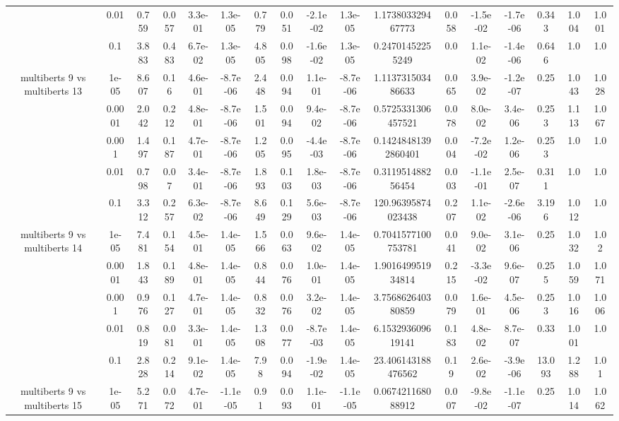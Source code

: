 \begin{tabular}{|c|c|c|c|c|c|c|c|c|c|c|c|c|c|c|c|c|}
 & 0.01 & 0.759 & 0.057 & 3.3e-01 & 1.3e-05 & 0.779 & 0.051 & -2.1e-02 & 1.3e-05 & 1.173803329467773 & 0.058 & -1.5e-02 & -1.7e-06 & 0.343 & 1.004 & 1.001 \\
 & 0.1 & 3.883 & 0.483 & 6.7e-02 & 1.3e-05 & 4.805 & 0.098 & -1.6e-02 & 1.3e-05 & 0.24701452255249 & 0.0 & 1.1e-02 & -1.4e-06 & 0.646 & 1.0 & 1.0 \\
\hline
\multirow{5}{*}{multiberts 9 vs multiberts 13} & 1e-05 & 8.607 & 0.16 & 4.6e-01 & -8.7e-06 & 2.448 & 0.094 & 1.1e-01 & -8.7e-06 & 1.113731503486633 & 0.065 & 3.9e-02 & -1.2e-07 & 0.25 & 1.043 & 1.028 \\
 & 0.0001 & 2.042 & 0.212 & 4.8e-01 & -8.7e-06 & 1.501 & 0.094 & 9.4e-02 & -8.7e-06 & 0.5725331306457521 & 0.078 & 8.0e-02 & 3.4e-06 & 0.253 & 1.113 & 1.067 \\
 & 0.001 & 1.497 & 0.187 & 4.7e-01 & -8.7e-06 & 1.205 & 0.095 & -4.4e-03 & -8.7e-06 & 0.14248481392860401 & 0.004 & -7.2e-02 & 1.2e-06 & 0.253 & 1.0 & 1.0 \\
 & 0.01 & 0.798 & 0.07 & 3.4e-01 & -8.7e-06 & 1.893 & 0.103 & 1.8e-03 & -8.7e-06 & 0.311951488256454 & 0.003 & -1.1e-01 & 2.5e-07 & 0.311 & 1.0 & 1.0 \\
 & 0.1 & 3.312 & 0.257 & 6.3e-02 & -8.7e-06 & 8.649 & 0.129 & 5.6e-03 & -8.7e-06 & 120.96395874023438 & 0.207 & 1.1e-02 & -2.6e-06 & 3.196 & 1.012 & 1.0 \\
\hline
\multirow{5}{*}{multiberts 9 vs multiberts 14} & 1e-05 & 7.481 & 0.154 & 4.5e-01 & 1.4e-05 & 1.566 & 0.063 & 9.6e-02 & 1.4e-05 & 0.7041577100753781 & 0.041 & 9.0e-02 & 3.1e-06 & 0.25 & 1.032 & 1.02 \\
 & 0.0001 & 1.843 & 0.189 & 4.8e-01 & 1.4e-05 & 0.844 & 0.076 & 1.0e-01 & 1.4e-05 & 1.901649951934814 & 0.215 & -3.3e-02 & 9.6e-07 & 0.255 & 1.059 & 1.071 \\
 & 0.001 & 0.976 & 0.127 & 4.7e-01 & 1.4e-05 & 0.832 & 0.076 & 3.2e-02 & 1.4e-05 & 3.756862640380859 & 0.079 & 1.6e-01 & 4.5e-06 & 0.253 & 1.016 & 1.006 \\
 & 0.01 & 0.819 & 0.081 & 3.3e-01 & 1.4e-05 & 1.308 & 0.077 & -8.7e-03 & 1.4e-05 & 6.153293609619141 & 0.183 & 4.8e-02 & 8.7e-07 & 0.33 & 1.001 & 1.0 \\
 & 0.1 & 2.828 & 0.214 & 9.1e-02 & 1.4e-05 & 7.98 & 0.094 & -1.9e-02 & 1.4e-05 & 23.406143188476562 & 0.19 & 2.6e-02 & -3.9e-06 & 13.093 & 1.288 & 1.01 \\
\hline
\multirow{5}{*}{multiberts 9 vs multiberts 15} & 1e-05 & 5.271 & 0.072 & 4.7e-01 & -1.1e-05 & 0.91 & 0.093 & 1.1e-01 & -1.1e-05 & 0.067421168088912 & 0.007 & -9.8e-02 & -1.1e-07 & 0.25 & 1.014 & 1.062 \\

\end{tabular}
